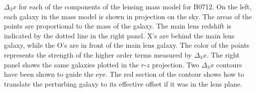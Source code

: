 \label{fieldrz} $\Delta_3x$ for each of the components of the lensing mass model for B0712. On the left, each galaxy in the mass model is shown in projection on the sky. The areas of the points are proportional to the mass of the galaxy. The main lens redshift is indicated by the dotted line in the right panel. X's are behind the main lens galaxy, while the O's are in front of the main lens galaxy. The color of the points represents the strength of the higher order terms measured by $\Delta_3 x$. The right panel shows the same galaxies plotted in the $r$-$z$ projection. Two $\Delta_3 x$ contours have been shown to guide the eye. The red section of the contour shows how to translate the perturbing galaxy to its effective offset if it was in the lens plane.  